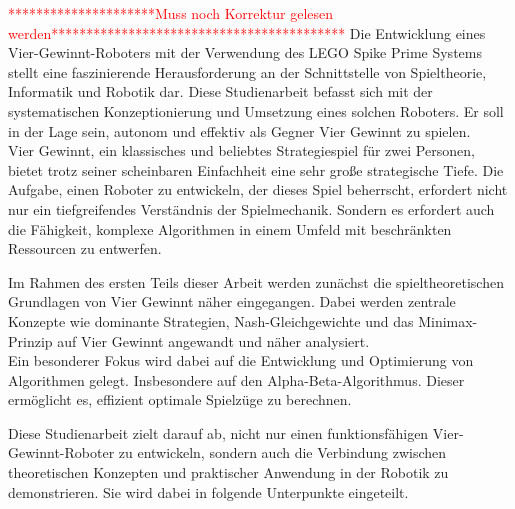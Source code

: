 \textcolor{red}{*********************Muss noch Korrektur gelesen werden******************************************}
Die Entwicklung eines Vier-Gewinnt-Roboters mit der Verwendung des LEGO Spike Prime Systems stellt eine faszinierende Herausforderung an der Schnittstelle von Spieltheorie, Informatik und Robotik dar. Diese Studienarbeit befasst sich mit der systematischen Konzeptionierung und Umsetzung eines solchen Roboters. Er soll in der Lage sein, autonom und effektiv als Gegner Vier Gewinnt zu spielen. \\
Vier Gewinnt, ein klassisches und beliebtes Strategiespiel für zwei Personen, bietet trotz seiner scheinbaren Einfachheit eine sehr große strategische Tiefe.
Die Aufgabe, einen Roboter zu entwickeln, der dieses Spiel beherrscht, erfordert nicht nur ein tiefgreifendes Verständnis der Spielmechanik. Sondern es erfordert auch die Fähigkeit, komplexe Algorithmen in einem  Umfeld  mit beschränkten Ressourcen zu entwerfen.

Im Rahmen des ersten Teils dieser Arbeit werden zunächst die spieltheoretischen Grundlagen von Vier Gewinnt näher eingegangen. Dabei werden zentrale Konzepte wie dominante Strategien, Nash-Gleichgewichte und das Minimax-Prinzip auf Vier Gewinnt angewandt und näher analysiert.\\
Ein besonderer Fokus wird dabei auf die Entwicklung und Optimierung von Algorithmen gelegt. Insbesondere auf den Alpha-Beta-Algorithmus. Dieser ermöglicht es, effizient optimale Spielzüge zu berechnen.

Diese Studienarbeit zielt darauf ab, nicht nur einen funktionsfähigen Vier-Gewinnt-Roboter zu entwickeln, sondern auch die Verbindung zwischen theoretischen Konzepten und praktischer Anwendung in der Robotik zu demonstrieren. Sie wird dabei in folgende Unterpunkte eingeteilt.

\newpage

